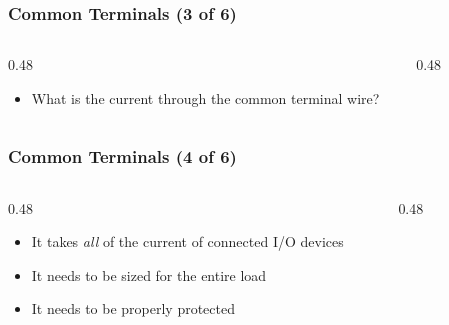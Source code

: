 \begin{frame}
    \frametitle{Common Terminals (3 of 6)}

    \begin{columns}
        \begin{column}{0.48\linewidth}
            \begin{itemize}
                \item What is the current through the common terminal wire?
            \end{itemize}
        \end{column}
        \begin{column}{0.48\linewidth}
            \begin{figure}
                \centering
                \resizebox{0.875\columnwidth}{!}{
                    
                }
            \end{figure}
        \end{column}
    \end{columns}
\end{frame}

\begin{frame}
    \frametitle{Common Terminals (4 of 6)}

    \begin{columns}
        \begin{column}{0.48\linewidth}
            \begin{itemize}
                \item It takes \emph{all} of the current of connected I/O devices
                \item It needs to be sized for the entire load
                \item It needs to be properly protected
            \end{itemize}
        \end{column}
        \begin{column}{0.48\linewidth}
            \begin{figure}
                \centering
                \resizebox{0.875\columnwidth}{!}{
                    
                }
            \end{figure}
        \end{column}
    \end{columns}
\end{frame}

